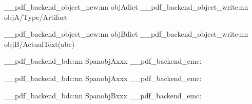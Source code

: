 \documentclass{article}
\begin{document}
\ExplSyntaxOn
\__pdf_backend_object_new:nn   {objA}{dict}
\__pdf_backend_object_write:nn {objA}{/Type/Artifact}

\__pdf_backend_object_new:nn   {objB}{dict}
\__pdf_backend_object_write:nn {objB}{/ActualText(abc)}


\__pdf_backend_bdc:nn {Span}{objA}xxx
\__pdf_backend_emc:

\__pdf_backend_bdc:nn {Span}{objA}xxx
\__pdf_backend_emc:

\__pdf_backend_bdc:nn {Span}{objB}xxx
\__pdf_backend_emc:

\ExplSyntaxOff
\end{document}
